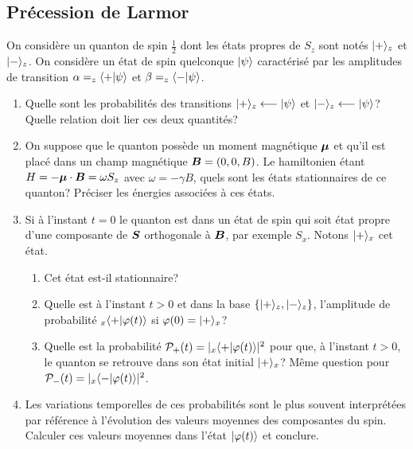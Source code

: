\subsection{Précession de Larmor}

On considère un quanton de spin $\frac{1}{2}$ dont les états propres de
$S_z$ sont notés $\vert+\rangle_z$ et $\vert-\rangle_z$. On considère un état de spin
quelconque $\vert\psi\rangle$ caractérisé par les amplitudes de transition
$\alpha=_z\langle+\vert\psi\rangle$ et $\beta=_z\langle-\vert\psi\rangle$.

\begin{enumerate}
\item Quelle sont les probabilités des transitions $\vert+\rangle_z\longleftarrow
\vert\psi\rangle$ et $\vert-\rangle_z\longleftarrow\vert\psi\rangle$? Quelle relation doit lier
ces deux quantités?

\item On suppose que le quanton possède un moment magnétique $\boldsymbol{\mu
}$ et qu'il est placé dans un champ magnétique $\boldsymbol{B}=(0,0,B)$. Le
hamiltonien étant $H=-\boldsymbol{\mu}\cdot\boldsymbol{B}=\omega S_z$ avec
$\omega=-\gamma B$, quels sont les états stationnaires de ce quanton? Préciser
les énergies associées à ces états.

\item Si à l'instant $t=0$ le quanton est dans un état de spin qui soit état
propre d'une composante de $\boldsymbol{S}$ orthogonale à $\boldsymbol{B}$,
par exemple $S_{x}$. Notons $\vert+\rangle_{x}$ cet état.

\begin{enumerate}
\item Cet état est-il stationnaire?

\item Quelle est à l'instant $t>0$ et dans la base $\{\vert+\rangle_z,\vert-\rangle_z
\}$, l'amplitude de probabilité $_{x}\langle+\vert\varphi(t)\rangle$ si
$\varphi(0)=\vert+\rangle_{x}$?

\item Quelle est la probabilité $\mathcal{P}_{+}(t)=|_{x}\langle
+\vert\varphi(t)\rangle|^{2}$ pour que, à l'instant $t>0$, le quanton se retrouve dans
son état initial $\vert+\rangle_{x}$? Même question pour $\mathcal{P}_{-}(t)=
|_{x}\langle -\vert\varphi(t)\rangle|^{2}$.
\end{enumerate}

\item Les variations temporelles de ces probabilités sont le plus souvent
interprétées par référence à l'évolution des valeurs moyennes des composantes
du spin. Calculer ces valeurs moyennes dans l'état $\vert\varphi(t)\rangle$ et
conclure.


\end{enumerate}
